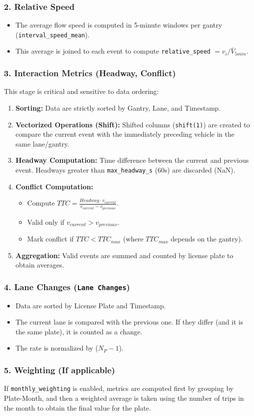 \subsubsection{2. Relative Speed}
\begin{itemize}
    \item The average flow speed is computed in 5-minute windows per gantry (\texttt{interval\_speed\_mean}).
    \item This average is joined to each event to compute \texttt{relative\_speed} $= v_i / \bar{V}_{5min}$.
\end{itemize}

\subsubsection{3. Interaction Metrics (Headway, Conflict)}
This stage is critical and sensitive to data ordering:
\begin{enumerate}
    \item \textbf{Sorting:} Data are strictly sorted by Gantry, Lane, and Timestamp.
    \item \textbf{Vectorized Operations (Shift):} Shifted columns (\texttt{shift(1)}) are created to compare the current event with the immediately preceding vehicle in the same lane/gantry.
    \item \textbf{Headway Computation:} Time difference between the current and previous event. Headways greater than \texttt{max\_headway\_s} (60s) are discarded (NaN).
    \item \textbf{Conflict Computation:}
        \begin{itemize}
            \item Compute $TTC = \frac{Headway \cdot v_{current}}{v_{current} - v_{previous}}$.
            \item Valid only if $v_{current} > v_{previous}$.
            \item Mark conflict if $TTC < TTC_{max}$ (where $TTC_{max}$ depends on the gantry).
        \end{itemize} 
    \item \textbf{Aggregation:} Valid events are summed and counted by license plate to obtain averages.
\end{enumerate}

\subsubsection{4. Lane Changes (\texttt{Lane Changes})}
\begin{itemize}
    \item Data are sorted by License Plate and Timestamp.
    \item The current lane is compared with the previous one. If they differ (and it is the same plate), it is counted as a change.
    \item The rate is normalized by ($N_P - 1$).
\end{itemize}

\subsubsection{5. Weighting (If applicable)}
If \texttt{monthly\_weighting} is enabled, metrics are computed first by grouping by Plate-Month, and then a weighted average is taken using the number of trips in the month to obtain the final value for the plate.
